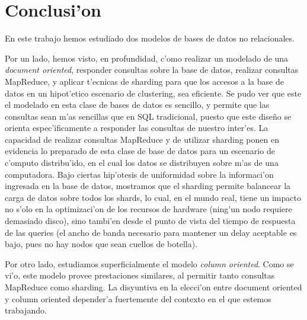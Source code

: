 \section{Conclusi'on}

En este trabajo hemos estudiado dos modelos de bases de datos no relacionales.

Por un lado, hemos visto, en profundidad, c'omo realizar un modelado de una \textit{document oriented}, responder consultas sobre la base de datos, realizar consultas MapReduce, y aplicar t'ecnicas de sharding para que los accesos a la base de datos en un hipot'etico escenario de clustering, sea eficiente. Se pudo ver que este el modelado en esta clase de bases de datos es sencillo, y permite que las consultas sean m'as sencillas que en SQL tradicional, puesto que este dise\~no se orienta espec'ificamente a responder las consultas de nuestro inter'es. La capacidad de realizar consultas MapReduce y de utilizar sharding ponen en evidencia lo preparado de esta clase de base de datos para un escenario de c'omputo distribu'ido, en el cual los datos se distribuyen sobre m'as de una computadora. Bajo ciertas hip'otesis de uniformidad sobre la informaci'on ingresada en la base de datos, mostramos que el sharding permite balancear la carga de datos sobre todos los shards, lo cual, en el mundo real, tiene un impacto no s'olo en la optimizaci'on de los recursos de hardware (ning'un nodo requiere demasiado disco), sino tambi'en desde el punto de vista del tiempo de respuesta de las queries (el ancho de banda necesario para mantener un delay aceptable es bajo, pues no hay nodos que sean cuellos de botella).

Por otro lado, estudiamos superficialmente el modelo \textit{column oriented}. Como se vi'o, este modelo provee prestaciones similares, al permitir tanto consultas MapReduce como sharding. La disyuntiva en la elecci'on entre document oriented y column oriented depender'a fuertemente del contexto en el que estemos trabajando.